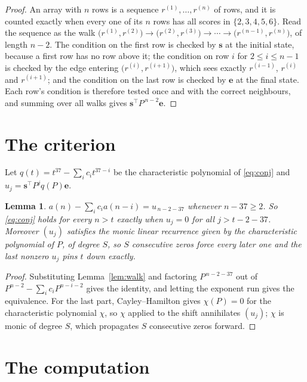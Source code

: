 \documentclass[11pt,a4paper]{article}
\theoremstyle{plain}
\newtheorem{lemma}[theorem]{Lemma}
\theoremstyle{definition}
\begin{document}
\begin{proof}
An array with $n$ rows is a sequence $r^{(1)},\dots,r^{(n)}$ of rows, and it is counted
exactly when every one of its $n$ rows has all scores in $\{2,3,4,5,6\}$. Read the sequence as the
walk $\bigl(r^{(1)},r^{(2)}\bigr)\to\bigl(r^{(2)},r^{(3)}\bigr)\to\cdots\to
\bigl(r^{(n-1)},r^{(n)}\bigr)$, of length $n-2$. The condition on the first row is
checked by $\mathbf{s}$ at the initial state, because a first row has no row above it; the
condition on row $i$ for $2\le i\le n-1$ is checked by the edge entering
$\bigl(r^{(i)},r^{(i+1)}\bigr)$, which sees exactly $r^{(i-1)}$, $r^{(i)}$ and
$r^{(i+1)}$; and the condition on the last row is checked by $\mathbf{e}$ at the final
state. Each row's condition is therefore tested once and with the correct neighbours, and
summing over all walks gives $\mathbf{s}^{\!\top}P^{\,n-2}\mathbf{e}$.
\end{proof}

\section{The criterion}

Let $q(t)=t^{37}-\sum_i c_i t^{37-i}$ be the characteristic polynomial of
\eqref{eq:conj} and $u_j=\mathbf{s}^{\!\top}P^{j}q(P)\mathbf{e}$.

\begin{lemma}\label{lem:crit}
$a(n)-\sum_i c_i a(n-i)=u_{\,n-2-37}$ whenever $n-37\ge2$. So \eqref{eq:conj}
holds for every $n>t$ exactly when $u_j=0$ for all $j>t-2-37$. Moreover $(u_j)$
satisfies the monic linear recurrence given by the characteristic polynomial of $P$, of
degree $S$, so $S$ consecutive zeros force every later one and the last nonzero $u_j$ pins
$t$ down exactly.
\end{lemma}

\begin{proof}
Substituting Lemma~\ref{lem:walk} and factoring $P^{\,n-2-37}$ out of
$P^{n-2}-\sum_i c_i P^{n-i-2}$ gives the identity, and letting the exponent run gives the
equivalence. For the last part, Cayley--Hamilton gives $\chi(P)=0$ for the characteristic
polynomial $\chi$, so $\chi$ applied to the shift annihilates $(u_j)$; $\chi$ is monic of
degree $S$, which propagates $S$ consecutive zeros forward.
\end{proof}

\section{The computation}
\end{document}
